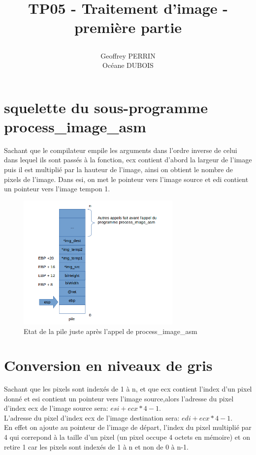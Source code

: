 \documentclass[11pt]{report}
\title{\textbf{TP05 - Traitement d'image - première partie }
\author{Geoffrey PERRIN \\ Océane DUBOIS\\}
\date{}}
\begin{document}
\maketitle

\newpage

\section{squelette du sous-programme process\_image\_asm}

Sachant que le compilateur empile les arguments dans l'ordre inverse de celui dans lequel ils sont passés à la fonction, ecx contient d'abord la largeur de l'image puis il est multiplié par la hauteur de l'image, ainsi on obtient le nombre de pixels de l'image.
Dans esi, on met le pointeur vers l'image source et edi contient un pointeur vers l'image tempon 1.


\begin{figure}[ht]
\includegraphics[width=8cm]{pile.png}
\caption{Etat de la pile juste après l'appel de process\_image\_asm}
\end{figure}

\section{Conversion en niveaux de gris}

Sachant que les pixels sont indexés de 1 à n, et que ecx contient l'index d'un pixel donné et esi contient un pointeur vers l'image source,alors l'adresse du pixel d'index ecx de l'image source sera: $esi+ecx*4-1$.
\\L'adresse du pixel d'index ecx de l'image destination sera: $edi+ecx*4-1$.
\\En effet on ajoute au pointeur de l'image de départ, l'index du pixel multiplié par 4 qui correpond à la taille d'un pixel (un pixel occupe 4 octets en mémoire) et on retire 1 car les pixels sont indexés de 1 à n et non de 0 à n-1.
\end{document}
